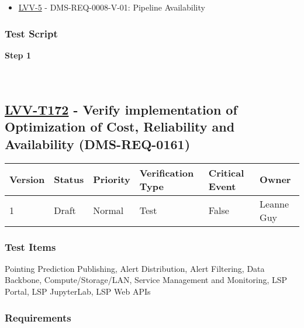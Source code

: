 \begin{itemize}
\tightlist
\item
  \href{https://jira.lsstcorp.org/browse/LVV-5}{LVV-5} -
  DMS-REQ-0008-V-01: Pipeline Availability
\end{itemize}

\hypertarget{test-script-71}{%
\subsubsection{Test Script}\label{test-script-71}}

\textbf{Step 1}\\
~\\
~\\

\hypertarget{lvv-t172---verify-implementation-of-optimization-of-cost-reliability-and-availability-dms-req-0161}{%
\subsection{\texorpdfstring{\href{https://jira.lsstcorp.org/secure/Tests.jspa\#/testCase/LVV-T172}{LVV-T172}
- Verify implementation of Optimization of Cost, Reliability and
Availability
(DMS-REQ-0161)}{LVV-T172 - Verify implementation of Optimization of Cost, Reliability and Availability (DMS-REQ-0161)}}\label{lvv-t172---verify-implementation-of-optimization-of-cost-reliability-and-availability-dms-req-0161}}

\begin{longtable}[]{@{}llllll@{}}
\toprule
Version & Status & Priority & Verification Type & Critical Event &
Owner\tabularnewline
\midrule
\endhead
1 & Draft & Normal & Test & False & Leanne Guy\tabularnewline
\bottomrule
\end{longtable}

\hypertarget{test-items-72}{%
\subsubsection{Test Items}\label{test-items-72}}

Pointing Prediction Publishing, Alert Distribution, Alert Filtering,
Data Backbone, Compute/Storage/LAN, Service Management and Monitoring,
LSP Portal, LSP JupyterLab, LSP Web APIs

\hypertarget{requirements-72}{%
\subsubsection{Requirements}\label{requirements-72}}

